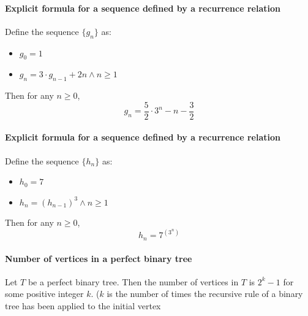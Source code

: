 \documentclass[a4paper]{article}
\begin{document}
\paragraph{Explicit formula for a sequence defined by a recurrence relation}
Define the sequence $\{g_n\}$ as:
\begin{itemize}
  \item $g_0 = 1$
  \item $g_n = 3 \cdot g_{n-1} + 2n \land n \geq 1$
\end{itemize}
Then for any $n \geq 0$, 
\begin{equation*}
  g_n = \frac{5}{2} \cdot 3^n - n - \frac{3}{2}
\end{equation*}
\paragraph{Explicit formula for a sequence defined by a recurrence relation}
Define the sequence $\{h_n\}$ as:
\begin{itemize}
  \item $h_0 = 7$
  \item $h_n = (h_{n-1})^3 \land n \geq 1$
\end{itemize}
Then for any $n \geq 0$, 
\begin{equation*}
  h_n = 7^{(3^n)}
\end{equation*}
\paragraph{Number of vertices in a perfect binary tree}
Let $T$ be a perfect binary tree. Then the number of vertices in $T$ is $2^k - 1$ for some positive integer $k$. ($k$ is the number of times the recursive rule of a binary tree has been applied to the initial vertex
\end{document}
